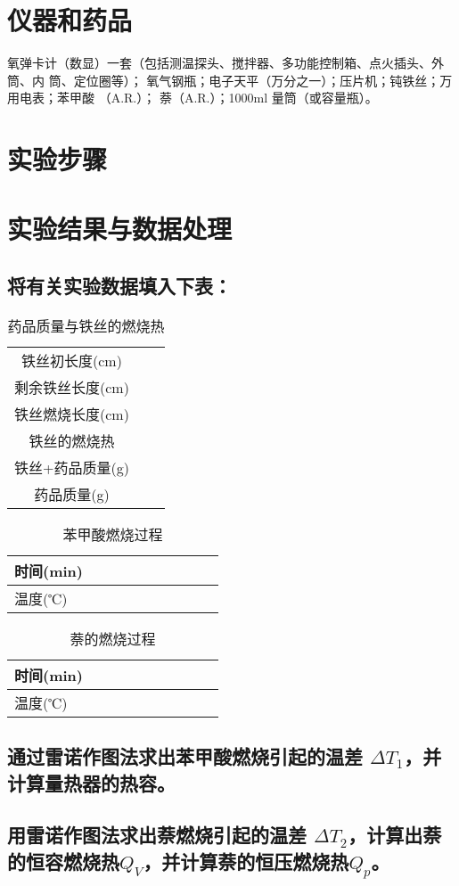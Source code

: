 \documentclass{pkureport}
\begin{document}
	\section{仪器和药品}
		氧弹卡计（数显）一套（包括测温探头、搅拌器、多功能控制箱、点火插头、外筒、内
		筒、定位圈等）； 氧气钢瓶；电子天平（万分之一）；压片机；钝铁丝；万用电表；苯甲酸
		（A.R.）； 萘（A.R.）；1000ml 量筒（或容量瓶）。
	\section{实验步骤}
	\clearpage
	\section{实验结果与数据处理}
		\subsection{将有关实验数据填入下表：}
		\begin{table}[h]
			\centering
			\renewcommand\arraystretch{1.2}
			\caption{药品质量与铁丝的燃烧热}
			\begin{tabular}{@{}ccc@{}}
				\toprule
				& \makebox[0.3\textwidth][c]{苯甲酸} & \makebox[0.2\textwidth][c]{萘} \\ \midrule
				铁丝初长度(cm)  &     &   \\
				剩余铁丝长度(cm) &     &   \\
				铁丝燃烧长度(cm) &     &   \\
				铁丝的燃烧热     &     &   \\ \midrule
				铁丝+药品质量(g) &     &   \\
				药品质量(g)    &     &   \\ \bottomrule
			\end{tabular}
		\end{table}
	
		\begin{table}[h]
			\centering
			\renewcommand\arraystretch{1.2}
			\caption{苯甲酸燃烧过程}
			\begin{tabular}{@{}llllllllll@{}}
				\toprule
				时间(min)  & \makebox[0.8\textwidth][c]{}  \\ \midrule
				温度(℃)  &    \\ \bottomrule
			\end{tabular}
		\end{table}
	
		\begin{table}[h]
			\centering
			\renewcommand\arraystretch{1.2}
			\caption{萘的燃烧过程}
			\begin{tabular}{@{}llllllllll@{}}
				\toprule
				时间(min)  & \makebox[0.8\textwidth][c]{}  \\ \midrule
				温度(℃)  &    \\ \bottomrule
			\end{tabular}
		\end{table}
		\subsection{通过雷诺作图法求出苯甲酸燃烧引起的温差 $ \Delta T_1 $，并计算量热器的热容。}
		
		\subsection{用雷诺作图法求出萘燃烧引起的温差 $ \Delta T_2 $，计算出萘的恒容燃烧热$ Q_V $，并计算萘的恒压燃烧热$ Q_p $。}
	\printbibliography
\end{document}
